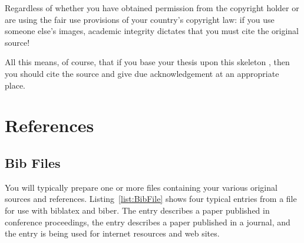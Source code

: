 Regardless of whether you have obtained permission from the copyright
holder or are using the fair use provisions of your country's
copyright law: if you use someone else's images, academic integrity
dictates that you must cite the original source!

All this means, of course, that if you base your thesis upon this
skeleton \citep{KeithThesis}, then you should cite the source and give
due acknowledgement at an appropriate place.









\section{References}



\subsection{Bib Files}


You will typically prepare one or more  files containing
your various original sources and references.
Listing~\ref{list:BibFile} shows four typical entries from a
 file for use with biblatex and biber. The
 entry describes a paper published in conference
proceedings, the  entry describes a paper published in
a journal, and the  entry is being used for internet
resources and web sites.




